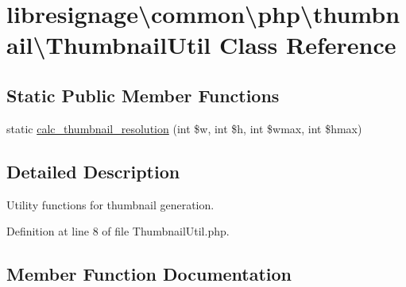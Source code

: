 \hypertarget{classlibresignage_1_1common_1_1php_1_1thumbnail_1_1ThumbnailUtil}{}\section{libresignage\textbackslash{}common\textbackslash{}php\textbackslash{}thumbnail\textbackslash{}Thumbnail\+Util Class Reference}
\label{classlibresignage_1_1common_1_1php_1_1thumbnail_1_1ThumbnailUtil}
\subsection*{Static Public Member Functions}
\begin{DoxyCompactItemize}
\item 
static \hyperlink{classlibresignage_1_1common_1_1php_1_1thumbnail_1_1ThumbnailUtil_a78e1dd84fb183482e204b2e099b638eb}{calc\+\_\+thumbnail\+\_\+resolution} (int \$w, int \$h, int \$wmax, int \$hmax)
\end{DoxyCompactItemize}


\subsection{Detailed Description}
Utility functions for thumbnail generation. 

Definition at line 8 of file Thumbnail\+Util.\+php.



\subsection{Member Function Documentation}
\mbox{\label{classlibresignage_1_1common_1_1php_1_1thumbnail_1_1ThumbnailUtil_a78e1dd84fb183482e204b2e099b638eb}} 
